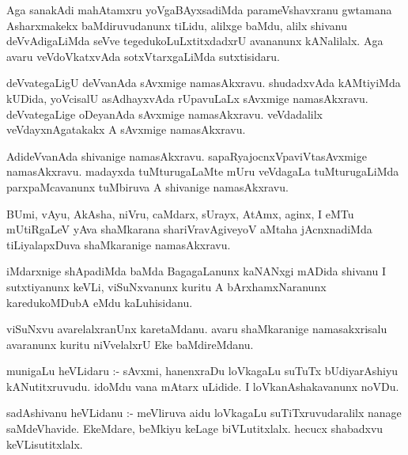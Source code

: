 \documentclass{article}
\begin{document}
\begin{mn}
Aga  sanakAdi  mahAtamxru  yoVgaBAyxsadiMda  parameVshavxranu  gwtamana  Asharxmakekx  baMdiruvudanunx  
tiLidu,  alilxge  baMdu,  alilx  shivanu  deVvAdigaLiMda  seVve  tegedukoLuLxtitxdadxrU  avananunx  
kANalilalx.  Aga  avaru  veVdoVkatxvAda  sotxVtarxgaLiMda  sutxtisidaru.
\end{mn}

\begin{mn}
deVvategaLigU  deVvanAda  sAvxmige  namasAkxravu.  shudadxvAda  kAMtiyiMda  kUDida,  yoVcisalU  
asAdhayxvAda  rUpavuLaLx  sAvxmige  namasAkxravu.  deVvategaLige  oDeyanAda  sAvxmige  namasAkxravu.  
veVdadalilx  veVdayxnAgatakakx  A  sAvxmige  namasAkxravu.
\end{mn}

\begin{mn}
AdideVvanAda  shivanige  namasAkxravu.  sapaRyajocnxVpaviVtasAvxmige  namasAkxravu.  madayxda  
tuMturugaLaMte  mUru  veVdagaLa  tuMturugaLiMda  parxpaMcavanunx  tuMbiruva  A  shivanige  namasAkxravu.
\end{mn}

\begin{mn}
BUmi,  vAyu,  AkAsha,  niVru,  caMdarx,  sUrayx,  AtAmx,  aginx,  I  eMTu  mUtiRgaLeV  yAva  shaMkarana  
shariVravAgiveyoV  aMtaha  jAcnxnadiMda  tiLiyalapxDuva  shaMkaranige  namasAkxravu.
\end{mn}

\begin{mn}
iMdarxnige  shApadiMda  baMda  BagagaLanunx  kaNANxgi  mADida  shivanu  I  sutxtiyanunx  keVLi,  
viSuNxvanunx  kuritu  A  bArxhamxNaranunx  karedukoMDubA  eMdu  kaLuhisidanu.
\end{mn}

\begin{mn}
viSuNxvu  avarelalxranUnx  karetaMdanu.  avaru  shaMkaranige  namasakxrisalu  avaranunx  
kuritu  niVvelalxrU  Eke  baMdireMdanu.
\end{mn}

\begin{mn}
munigaLu  heVLidaru :- sAvxmi,  hanenxraDu  loVkagaLu  suTuTx  bUdiyarAshiyu  kANutitxruvudu.  
idoMdu  vana  mAtarx  uLidide.  I  loVkanAshakavanunx  noVDu.
\end{mn}

\begin{mn}
sadAshivanu  heVLidanu :-  meVliruva  aidu  loVkagaLu  suTiTxruvudaralilx  nanage  saMdeVhavide.  
EkeMdare,  beMkiyu  keLage  biVLutitxlalx.  hecucx  shabadxvu  keVLisutitxlalx.
\end{mn}
\end{document}
